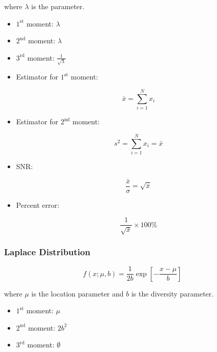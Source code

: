 where $\lambda$ is the parameter.

\begin{itemize}
    \item $1^\text{st}$ moment: $\lambda$
    \item $2^\text{nd}$ moment: $\lambda$
    \item $3^\text{rd}$ moment: $\frac{1}{\sqrt{\lambda}}$
    \item Estimator for $1^\text{st}$ moment:

          \begin{equation*}
              \bar{x} = \sum_{i=1}^{N} x_i
          \end{equation*}
    \item Estimator for $2^\text{nd}$ moment:

          \begin{equation*}
              s^2 = \sum_{i=1}^{N} x_i = \bar{x}
          \end{equation*}
    \item SNR:

          \begin{equation*}
              \frac{\bar{x}}{\sigma} = \sqrt{\bar{x}}
          \end{equation*}
    \item Percent error:

          \begin{equation*}
              \frac{1}{\sqrt{\bar{x}}} \times 100\%
          \end{equation*}
\end{itemize}

\subsubsection{Laplace Distribution}

\begin{equation*}
    f(x; \mu, b) = \frac{1}{2b} \exp\left[-\frac{x-\mu}{b}\right]
\end{equation*}

where $\mu$ is the location parameter and $b$ is the diversity parameter.

\begin{itemize}
    \item $1^\text{st}$ moment: $\mu$
    \item $2^\text{nd}$ moment: $2b^2$
    \item $3^\text{rd}$ moment: $\emptyset$
\end{itemize}

